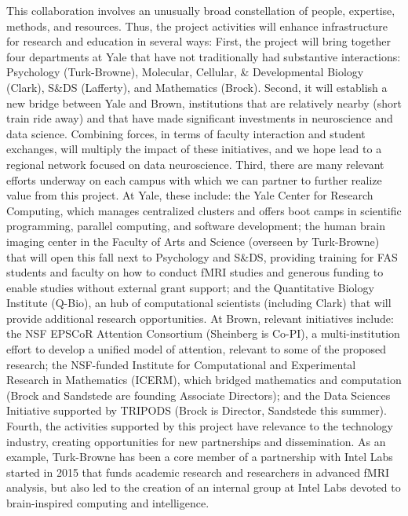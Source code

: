 This collaboration involves an unusually broad constellation of people,
expertise, methods, and resources. Thus, the project activities will
enhance infrastructure for research and education in several ways:
First, the project will bring together four departments at Yale that
have not traditionally had substantive interactions: Psychology
(Turk-Browne), Molecular, Cellular, \& Developmental Biology (Clark),
S\&DS (Lafferty), and Mathematics (Brock). Second, it will establish a
new bridge between Yale and Brown, institutions that are relatively
nearby (short train ride away) and that have made significant
investments in neuroscience and data science. Combining forces, in terms
of faculty interaction and student exchanges, will multiply the impact
of these initiatives, and we hope lead to a regional network focused on
data neuroscience. Third, there are many relevant efforts underway on
each campus with which we can partner to further realize value from this
project. At Yale, these include: the Yale Center for Research Computing,
which manages centralized clusters and offers boot camps in scientific
programming, parallel computing, and software development; the human
brain imaging center in the Faculty of Arts and Science (overseen by
Turk-Browne) that will open this fall next to Psychology and S\&DS,
providing training for FAS students and faculty on how to conduct fMRI
studies and generous funding to enable studies without external grant
support; and the Quantitative Biology Institute (Q-Bio), an hub of
computational scientists (including Clark) that will provide additional
research opportunities. At Brown, relevant initiatives include: the NSF
EPSCoR Attention Consortium (Sheinberg is Co-PI), a multi-institution
effort to develop a unified model of attention, relevant to some of the
proposed research; the NSF-funded Institute for Computational and
Experimental Research in Mathematics (ICERM), which bridged mathematics
and computation (Brock and Sandstede are founding Associate Directors);
and the Data Sciences Initiative supported by TRIPODS (Brock is
Director, Sandstede this summer). Fourth, the activities supported by
this project have relevance to the technology industry, creating
opportunities for new partnerships and dissemination. As an example,
Turk-Browne has been a core member of a partnership with Intel Labs
started in 2015 that funds academic research and researchers in advanced
fMRI analysis, but also led to the creation of an internal group at
Intel Labs devoted to brain-inspired computing and intelligence.

